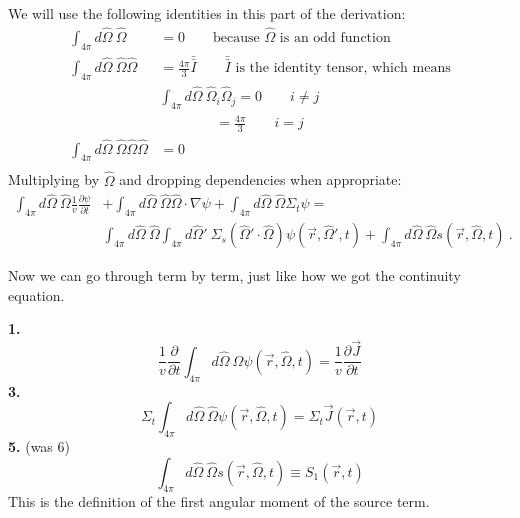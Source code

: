 \documentclass[12pt]{article}
\newcommand{\vOmega}{\ensuremath{\hat{\Omega}}}
\begin{document}
We will use the following identities in this part of the derivation:
\begin{align*} 
\int_{4\pi} d\vOmega \:\vOmega &= 0 \qquad \text{because }\vOmega\text{ is an odd function} \\
%
\int_{4\pi} d\vOmega\: \vOmega \vOmega &= \frac{4\pi}{3}\bar{\bar{I}} \qquad \bar{\bar{I}}\text{ is the identity tensor, which means} \\
%
&\int_{4\pi} d\vOmega\: \vOmega_i \vOmega_j = 0 \qquad i \neq j \nonumber \\
&\qquad \qquad = \frac{4\pi}{3} \qquad i = j \nonumber \\
%
\int_{4\pi} d\vOmega \: \vOmega \vOmega \vOmega &= 0 \qquad \\
\end{align*}
%
Multiplying by $\vOmega$ and dropping dependencies when appropriate:
%
\begin{align*}
\int_{4\pi} d\vOmega\: \vOmega \frac{1}{v}\frac{\partial \psi}{\partial t} &+ 
\int_{4\pi} d\vOmega\: \vOmega \vOmega \cdot \nabla \psi + 
\int_{4\pi} d\vOmega\: \vOmega \Sigma_t \psi =\nonumber \\
&\int_{4\pi} d\vOmega\: \vOmega \int_{4\pi} d\vOmega'\: \Sigma_s(\vOmega' \cdot \vOmega) \psi(\vec{r}, \vOmega', t) +
\int_{4\pi} d\vOmega\: \vOmega s(\vec{r}, \vOmega, t)\:.
\end{align*}

Now we can go through term by term, just like how we got the continuity equation.

\textbf{1.}
\begin{equation}
\frac{1}{v}\frac{\partial}{\partial t} \int_{4\pi} d\vOmega\: \vOmega \psi(\vec{r}, \vOmega, t) = \boxed{\frac{1}{v}\frac{\partial \vec{J}}{\partial t}} \nonumber
\end{equation}
\textbf{3.} 
\begin{equation}
\Sigma_t \int_{4\pi} d\vOmega\: \vOmega \psi(\vec{r}, \vOmega, t) = \boxed{\Sigma_t  \vec{J}(\vec{r}, t)} \nonumber
\end{equation}
\textbf{5.} (was 6)
\begin{equation}
\int_{4\pi} d\vOmega\: \vOmega s(\vec{r}, \vOmega, t) \equiv \boxed{S_{1}(\vec{r}, t)}  \nonumber
\end{equation}
This is the definition of the first angular moment of the source term. 
\end{document}
